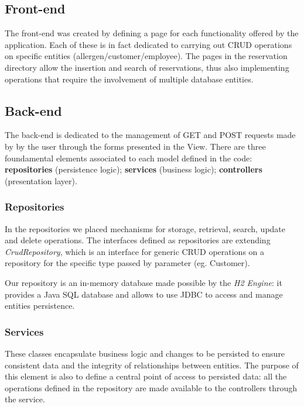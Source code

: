 \documentclass{article}
\begin{document}
\begin{multicols}{2}
\subsection*{Front-end}
The front-end was created by defining a page for each functionality offered by the application. Each of these is in fact dedicated to carrying out CRUD operations on specific entities (allergen/customer/employee). The pages in the reservation directory allow the insertion and search of reservations, thus also implementing operations that require the involvement of multiple database entities.

\subsection*{Back-end}
The back-end is dedicated to the management of GET and POST requests made by by the user through the forms presented in the View. There are three foundamental elements associated to each model defined in the code: \textbf{repositories} (persistence logic); \textbf{services} (business logic); \textbf{controllers} (presentation layer).

\subsubsection*{Repositories}
In the repositories we placed mechanisms for storage, retrieval, search, update and delete operations. The interfaces defined as repositories are extending \textit{CrudRepository}, which is an interface for generic CRUD operations on a repository for the specific type passed by parameter (eg. Customer).

Our repository is an in-memory database made possible by the \textit{H2 Engine}: it provides a Java SQL database and allows to use JDBC to access and manage entities persistence.

\subsubsection*{Services}
These classes encapsulate business logic and changes to be persisted to ensure consistent data and the integrity of relationships between entities.
The purpose of this element is also to define a central point of access to persisted data: all the operations defined in the repository are made available to the controllers through the service.

\end{multicols}
\end{document}
